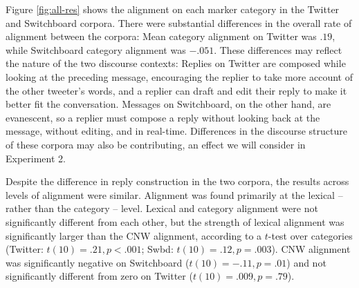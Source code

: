 \documentclass[11pt]{article}
\begin{document}
%
%

Figure \ref{fig:all-res} shows the alignment on each marker category in the Twitter and Switchboard corpora. There were substantial differences in the overall rate of alignment between the corpora: Mean category alignment on Twitter was $.19$, while Switchboard category alignment was $-.051$. These differences may reflect the nature of the two discourse contexts: Replies on Twitter are composed while looking at the preceding message, encouraging the replier to take more account of the other tweeter's words, and a replier can draft and edit their reply to make it better fit the conversation.  Messages on Switchboard, on the other hand, are evanescent, so a replier must compose a reply without looking back at the message, without editing, and in real-time. Differences in the discourse structure of these corpora may also be contributing, an effect we will consider in Experiment 2.  %

Despite the difference in reply construction in the two corpora, the results across levels of alignment were similar. Alignment was found primarily at the lexical -- rather than the category -- level. Lexical and category alignment were not significantly different from each other, but the strength of lexical alignment was significantly larger than the CNW alignment, according to a $t$-test over categories (Twitter: $t(10)=.21, p<.001$; Swbd: $t(10)=.12,p=.003$). CNW alignment was significantly negative on Switchboard ($t(10)=-.11, p=.01$) and not significantly different from zero on Twitter ($t(10)=.009, p=.79$).
\end{document}
